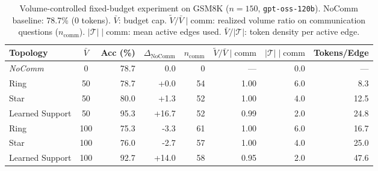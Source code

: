 \begin{table}[t]
\centering
\caption{Volume-controlled fixed-budget experiment on GSM8K ($n=150$, \texttt{gpt-oss-120b}). NoComm baseline: 78.7\% (0 tokens). $\bar{V}$: budget cap. $\widetilde{V}/\bar{V}\mid\text{comm}$: realized volume ratio on communication questions ($n_{\text{comm}}$). $|\mathcal{T}|\mid\text{comm}$: mean active edges used. $\bar{V}/|\mathcal{T}|$: token density per active edge.}
\label{tab:honest_fixed_budget}
\small
\begin{tabular}{lcrrrrrr}
\toprule
Topology & $\bar{V}$ & Acc (\%) & $\Delta_{\text{NoComm}}$ & $n_{\text{comm}}$ & $\widetilde{V}/\bar{V}\mid\text{comm}$ & $|\mathcal{T}|\mid\text{comm}$ & Tokens/Edge \\
\midrule
  \textit{NoComm} & 0 & 78.7 & 0.0 & 0 & --- & 0.0 & --- \\
  \midrule
  Ring & 50 & 78.7 & +0.0 & 54 & 1.00 & 6.0 & 8.3 \\
  Star & 50 & 80.0 & +1.3 & 52 & 1.00 & 4.0 & 12.5 \\
  Learned Support & 50 & 95.3 & +16.7 & 52 & 0.99 & 2.0 & 24.8 \\
  Ring & 100 & 75.3 & -3.3 & 61 & 1.00 & 6.0 & 16.7 \\
  Star & 100 & 76.0 & -2.7 & 57 & 1.00 & 4.0 & 25.0 \\
  Learned Support & 100 & 92.7 & +14.0 & 58 & 0.95 & 2.0 & 47.6 \\
\bottomrule
\end{tabular}
\end{table}